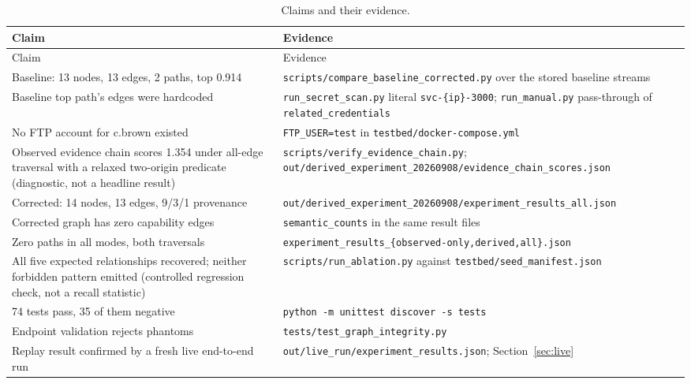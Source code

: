 \documentclass[11pt,a4paper]{article}
\newcommand{\bs}{\discretionary{}{}{}}
\begin{document}
\begin{longtable}{p{}p{}}
\caption{Claims and their evidence.}\label{tab:ledger}\\
\toprule Claim & Evidence \\
\midrule
\endfirsthead
\toprule Claim & Evidence \\
\midrule
\endhead
Baseline: 13 nodes, 13 edges, 2 paths, top 0.914 & \texttt{scripts/compare\_baseline\_corrected.py} over the stored baseline streams \\
Baseline top path's edges were hardcoded & \texttt{run\_secret\_scan.py} literal \texttt{svc-\{ip\}-3000}; \texttt{run\_manual.py} pass-through of \texttt{related\_credentials} \\
No FTP account for c.brown existed & \texttt{FTP\_USER=test} in \texttt{testbed/\bs docker-compose.yml} \\
Observed evidence chain scores 1.354 under all-edge traversal with a relaxed two-origin predicate (diagnostic, not a headline result) & \texttt{scripts/\bs verify\bs \_evidence\bs \_chain.py}; \texttt{out/\bs derived\bs \_experiment\bs \_20260908/\bs evidence\bs \_chain\bs \_scores.json} \\
Corrected: 14 nodes, 13 edges, 9/3/1 provenance & \texttt{out/\bs derived\bs \_experiment\bs \_20260908/\bs experiment\bs \_results\bs \_all.json} \\
Corrected graph has zero capability edges & \texttt{semantic\_counts} in the same result files \\
Zero paths in all modes, both traversals & \texttt{experiment\bs \_results\bs \_\{observed-only,\bs derived,\bs all\}.json} \\
All five expected relationships recovered; neither forbidden pattern emitted (controlled regression check, not a recall statistic) & \texttt{scripts/\bs run\_ablation.py} against \texttt{testbed/\bs seed\bs \_manifest.json} \\
74 tests pass, 35 of them negative & \texttt{python -m unittest discover -s tests} \\
Endpoint validation rejects phantoms & \texttt{tests/\bs test\_graph\_integrity.py} \\
Replay result confirmed by a fresh live end-to-end run & \texttt{out/\bs live\bs \_run/\bs experiment\bs \_results.json}; Section~\ref{sec:live} \\
\bottomrule
\end{longtable}
\end{document}
